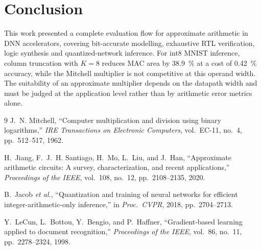 \documentclass[11pt,a4paper]{article}
\begin{document}
\section{Conclusion}
This work presented a complete evaluation flow for approximate arithmetic in
DNN accelerators, covering bit-accurate modelling, exhaustive RTL
verification, logic synthesis and quantized-network inference. For int8
MNIST inference, column truncation with $K=8$ reduces MAC area by
\SI{38.9}{\percent} at a cost of \SI{0.42}{\percent} accuracy, while the
Mitchell multiplier is not competitive at this operand width. The
suitability of an approximate multiplier depends on the datapath width and
must be judged at the application level rather than by arithmetic error
metrics alone.

\begin{thebibliography}{9}
J.~N. Mitchell, ``Computer multiplication and division using binary
logarithms,'' \emph{IRE Transactions on Electronic Computers}, vol.~EC-11,
no.~4, pp.~512--517, 1962.

H.~Jiang, F.~J.~H. Santiago, H.~Mo, L.~Liu, and J.~Han, ``Approximate
arithmetic circuits: A survey, characterization, and recent applications,''
\emph{Proceedings of the IEEE}, vol.~108, no.~12, pp.~2108--2135, 2020.

B.~Jacob \emph{et al.}, ``Quantization and training of neural networks for
efficient integer-arithmetic-only inference,'' in \emph{Proc.\ CVPR}, 2018,
pp.~2704--2713.

Y.~LeCun, L.~Bottou, Y.~Bengio, and P.~Haffner, ``Gradient-based learning
applied to document recognition,'' \emph{Proceedings of the IEEE}, vol.~86,
no.~11, pp.~2278--2324, 1998.
\end{thebibliography}
\end{document}
